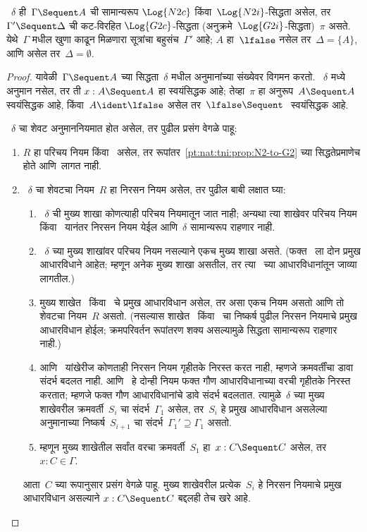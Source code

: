 \begin{prop}\label{pt:nor:tr:prop:normal-N2i-to-G2i}
~$\delta$ ही~$\Gamma \Sequent A$ ची सामान्यरूप
$\Log{N2c}$ किंवा~$\Log{N2i}$-सिद्धता असेल,
तर~$\Gamma' \Sequent \Delta$ ची कट-विरहित
$\Log{G2c}$-सिद्धता (अनुक्रमे~$\Log{G2i}$-सिद्धता)~$\pi$
असते. येथे~$\Gamma$ मधील खुणा काढून मिळणारा
सूत्रांचा बहुसंच~$\Gamma'$ आहे;
$A$ हा~$\lfalse$ नसेल तर~$\Delta = \{A\}$,
आणि असेल तर~$\Delta = \emptyset$.
\end{prop}

\begin{proof}
यावेळी~$\Gamma \Sequent A$ च्या सिद्धता~$\delta$
मधील अनुमानांच्या संख्येवर विगमन करतो.
~$\delta$ मध्ये अनुमान नसेल, तर ती
$x:A \Sequent A$ हा स्वयंसिद्धक आहे;
तेव्हा~$\pi$ हा अनुरूप~$A \Sequent A$
स्वयंसिद्धक आहे, किंवा~$A \ident \lfalse$
असेल तर~$\lfalse \Sequent \ $ स्वयंसिद्धक आहे.

~$\delta$ चा शेवट अनुमाननियमात होत असेल,
तर पुढील प्रसंग वेगळे पाहू:
\begin{enumerate}
  \item $R$ हा परिचय नियम किंवा~\FalseInt
  असेल, तर रूपांतर~\ref{pt:nat:tni:prop:N2-to-G2}
  च्या सिद्धतेप्रमाणेच होते आणि~\Cut लागत नाही.

  \item ~$\delta$ चा शेवटचा नियम~$R$ हा निरसन नियम
  असेल, तर पुढील बाबी लक्षात घ्या:
  \begin{enumerate}
    \item ~$\delta$ ची मुख्य शाखा कोणत्याही
    परिचय नियमातून जात नाही; अन्यथा त्या
    शाखेवर परिचय नियम किंवा~\FalseInt{}
    यानंतर निरसन नियम येईल आणि~$\delta$
    सामान्यरूप राहणार नाही.
    \item ~$\delta$ च्या मुख्य शाखांवर
    परिचय नियम नसल्याने एकच मुख्य शाखा
    असते. (फक्त~\Intro{\land} ला दोन प्रमुख
    आधारविधाने आहेत; म्हणून अनेक मुख्य शाखा असतील,
    तर त्या~\Intro{\land} च्या आधारविधानांतून जाव्या लागतील.)
    \item मुख्य शाखेत~\Elim{\lor} किंवा~\Elim{\lexists}
    चे प्रमुख आधारविधान असेल, तर असा एकच नियम
    असतो आणि तो शेवटचा नियम~$R$ असतो. (नसल्यास
    शाखेत~\Elim{\lor} किंवा~\Elim{\lexists}
    चा निष्कर्ष पुढील निरसन नियमाचे प्रमुख
    आधारविधान होईल; क्रमपरिवर्तन रूपांतरण शक्य असल्यामुळे
    सिद्धता सामान्यरूप राहणार नाही.)
  \item \Elim{\lor} आणि~\Elim{\lexists} यांखेरीज
  कोणताही निरसन नियम गृहीतके निरस्त करत नाही,
  म्हणजे क्रमवर्तींचा डावा संदर्भ बदलत नाही.
  \Elim{\lor} आणि~\Elim{\lexists} हे दोन्ही नियम
  फक्त गौण आधारविधानाच्या वरची
  गृहीतके निरस्त करतात; म्हणजे फक्त गौण
  आधारविधानांचे डावे संदर्भ बदलतात.
  त्यामुळे~$\delta$ च्या मुख्य शाखेवरील
  क्रमवर्ती~$S_i$ चा संदर्भ~$\Gamma_1$ असेल,
  तर~$S_i$ हे प्रमुख आधारविधान असलेल्या अनुमानाच्या
  निष्कर्ष~$S_{i+1}$ चा संदर्भ~$\Gamma_1' \supseteq \Gamma_1$
  असतो.
  \item म्हणून मुख्य शाखेतील सर्वांत वरचा
  क्रमवर्ती~$S_1$ हा~$x: C \Sequent C$
  असेल, तर~$x:C \in \Gamma$.
  \end{enumerate}
  आता~$C$ च्या रूपानुसार प्रसंग वेगळे पाहू.
  मुख्य शाखेवरील प्रत्येक~$S_i$ हे निरसन
  नियमाचे प्रमुख आधारविधान असल्याने
  $x:C \Sequent C$ बद्दलही तेच खरे आहे.


\end{enumerate}
\end{proof}
